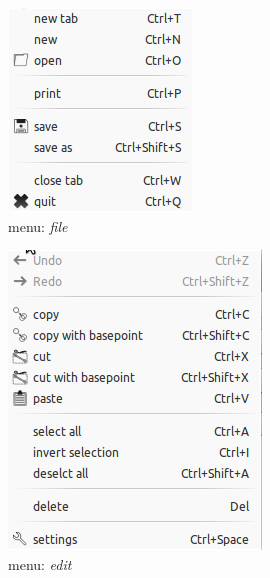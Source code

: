 \documentclass[a4paper,11pt]{report}
\begin{document}
\begin{minipage}[b]{\textwidth/2}
\begin{figure}[H]
\begin{center}
\includegraphics[scale=0.6]{./pictures/filemenu.png}
\caption{menu: \textit{file}}
\label{pic:filemenu}
\end{center}
\end{figure}
\end{minipage}
\begin{minipage}[b]{\textwidth/2}
\begin{figure}[H]
\begin{center}
\includegraphics[scale=0.6]{./pictures/editmenu.png}
\caption{menu: \textit{edit}}
\label{pic:editmenu}
\end{center}
\end{figure}
\end{minipage}
\end{document}
